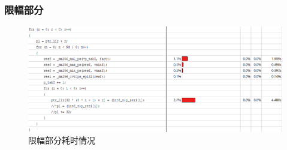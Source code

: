 \documentclass{article}
\begin{document}
\subsubsection{限幅部分}
\begin{figure}[H]
	\centering
	\includegraphics[width = .8\textwidth]{fix.png}
	\caption{限幅部分耗时情况}
\end{figure}





\end{document}
